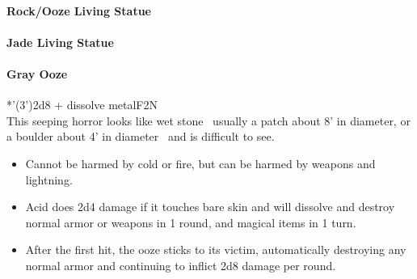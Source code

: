 \documentclass[english,11pt,openany,letterpaper,twocolumn]{book}
\begin{document}
\paragraph{Rock/Ooze Living Statue}
\vspace*{-\baselineskip}
\paragraph{Jade Living Statue}



\hypertarget{gray-ooze}{}
\paragraph{Gray Ooze}
*'(3')\tab 2d8 + dissolve metal\tab F2\tab N\\

This seeping horror looks like wet stone \dash\ usually a patch about 8' in diameter, or a boulder about 4' in diameter \dash\ and is difficult to see.

\begin{itemize}[leftmargin=*,label=\itshape\textbullet]
	\item
	Cannot be harmed by cold or fire, but can be harmed by weapons and lightning.
	\item
	Acid does 2d4 damage if it touches bare skin and will dissolve and destroy normal armor or weapons in 1 round, and magical items in 1 turn.
	\item
	After the first hit, the ooze sticks to its victim, automatically destroying any normal armor and continuing to inflict 2d8 damage per round.
\end{itemize}
\end{document}
